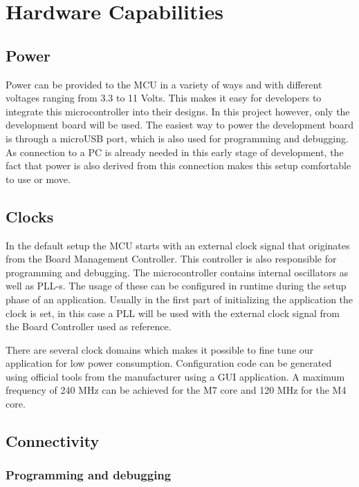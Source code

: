 \section{Hardware Capabilities}

\subsection{Power}

Power can be provided to the MCU in a variety of ways and with different voltages ranging from 3.3 to 11 Volts. This makes it easy for developers to integrate this microcontroller into their designs. In this project however, only the development board will be used. The easiest way to power the development board is through a microUSB port, which is also used for programming and debugging. As connection to a PC is already needed in this early stage of development, the fact that power is also derived from this connection makes this setup comfortable to use or move.

\subsection{Clocks}

In the default setup the MCU starts with an external clock signal that originates from the Board Management Controller. This controller is also responsible for programming and debugging. The microcontroller contains internal oscillators as well as PLL-s. The usage of these can be configured in runtime during the setup phase of an application. Usually in the first part of initializing the application the clock is set, in this case a PLL will be used with the external clock signal from the Board Controller used as reference.

There are several clock domains which makes it possible to fine tune our application for low power consumption. Configuration code can be generated using official tools from the manufacturer using a GUI application. A maximum frequency of 240 MHz can be achieved for the M7 core and 120 MHz for the M4 core.

\subsection{Connectivity}

\subsubsection{Programming and debugging}

